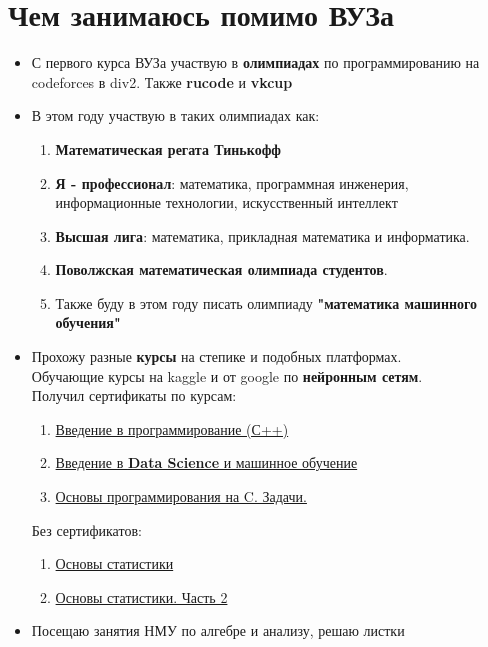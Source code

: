 \documentclass[a4paper,12pt]{article}
\begin{document}
\section{Чем занимаюсь помимо ВУЗа}
\begin{itemize}
    \item С первого курса ВУЗа участвую в \textbf{олимпиадах} по программированию на codeforces в div2. Также \textbf{rucode} и \textbf{vkcup}
    \item В этом году участвую в таких олимпиадах как:
        \begin{enumerate}
            \item \textbf{Математическая регата Тинькофф}
            \item \textbf{Я - профессионал}: математика, программная инженерия, информационные технологии, искусственный интеллект
            \item \textbf{Высшая лига}: математика, прикладная математика и информатика.
            \item \textbf{Поволжская математическая олимпиада студентов}.
            \item Также буду в этом году писать олимпиаду \textbf{"математика машинного обучения"}
        \end{enumerate}
    \item Прохожу разные \textbf{курсы} на степике и подобных платформах.
    \\ Обучающие курсы на kaggle и от google по \textbf{нейронным сетям}.
    \\Получил сертификаты по курсам:
        \begin{enumerate}
            \item \href{https://stepik.org/course/363/syllabus}{Введение в программирование (С++)}
            \item  \href{https://stepik.org/course/4852/syllabus}{Введение в \textbf{Data Science} и машинное обучение} 
            \item \href{https://stepik.org/course/3078/syllabus}{Основы программирования на C. Задачи.}
        \end{enumerate}
    Без сертификатов:
        \begin{enumerate}
            \item \href{https://stepik.org/course/76/syllabus}{Основы статистики}
            \item \href{https://stepik.org/course/524/syllabus}{Основы статистики. Часть 2}
        \end{enumerate}
    \item Посещаю занятия НМУ по алгебре и анализу, решаю листки
    
\end{itemize}
\end{document}
